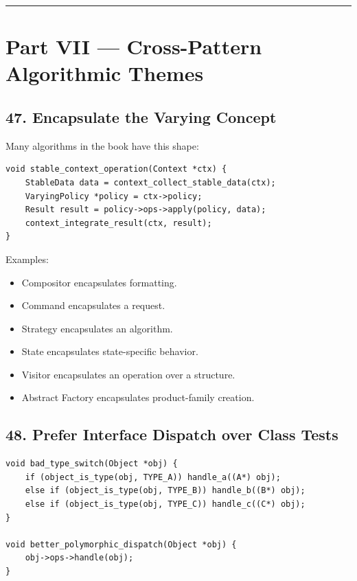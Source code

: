 \documentclass[11pt]{article}
\providecommand{\tightlist}{\setlength{\itemsep}{0pt}\setlength{\parskip}{0pt}}
\begin{document}
\begin{center}\rule{0.5\linewidth}{0.5pt}\end{center}

\section{Part VII --- Cross-Pattern Algorithmic Themes}\label{part-vii-cross-pattern-algorithmic-themes}

\subsection{47. Encapsulate the Varying Concept}\label{encapsulate-the-varying-concept}

Many algorithms in the book have this shape:

\begin{verbatim}
void stable_context_operation(Context *ctx) {
    StableData data = context_collect_stable_data(ctx);
    VaryingPolicy *policy = ctx->policy;
    Result result = policy->ops->apply(policy, data);
    context_integrate_result(ctx, result);
}
\end{verbatim}

Examples:

\begin{itemize}
\tightlist
\item
  Compositor encapsulates formatting.
\item
  Command encapsulates a request.
\item
  Strategy encapsulates an algorithm.
\item
  State encapsulates state-specific behavior.
\item
  Visitor encapsulates an operation over a structure.
\item
  Abstract Factory encapsulates product-family creation.
\end{itemize}

\subsection{48. Prefer Interface Dispatch over Class Tests}\label{prefer-interface-dispatch-over-class-tests}

\begin{verbatim}
void bad_type_switch(Object *obj) {
    if (object_is_type(obj, TYPE_A)) handle_a((A*) obj);
    else if (object_is_type(obj, TYPE_B)) handle_b((B*) obj);
    else if (object_is_type(obj, TYPE_C)) handle_c((C*) obj);
}

void better_polymorphic_dispatch(Object *obj) {
    obj->ops->handle(obj);
}
\end{verbatim}
\end{document}
